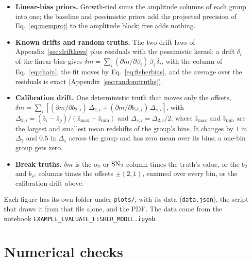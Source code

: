 \documentclass[11pt]{article}
\newcommand{\bstwo}{b_{s^2}}
\newcommand{\SNt}{{\rm SN}_2}
\begin{document}
\begin{itemize}
  \item \textbf{Linear-bias priors.}  Growth-tied sums the amplitude
    columns of each group into one; the baseline and pessimistic priors
    add the projected precision of Eq.~\eqref{eq:memproj} to the
    amplitude block; free adds nothing.
  \item \textbf{Known drifts and random truths.}  The two drift laws of
    Appendix~\ref{sec:driftlaws} plus residuals with the pessimistic
    kernel; a drift $\delta_i$ of the linear bias gives
    $\delta m = \sum_i (\partial m/\partial \beta_i)\,
    \beta_i\,\delta_i$, with the column of Eq.~\eqref{eq:chain}, the
    fit moves by Eq.~\eqref{eq:fisherbias}, and the average over the
    residuals is exact (Appendix~\ref{sec:randomtruths}).
  \item \textbf{Calibration drift.}  One deterministic truth that moves
    only the offsets,
    $\delta m = \sum_i [(\partial m/\partial b_{2,i})\,\Delta_{2,i}
    + (\partial m/\partial b_{s^2,i})\,\Delta_{s,i}]$, with
    $\Delta_{2,i} = (\bar{z}_i - \bar{z}_g)/(\bar{z}_{\max} - \bar{z}_{\min})$
    and $\Delta_{s,i} = \Delta_{2,i}/2$, where $\bar{z}_{\max}$ and
    $\bar{z}_{\min}$ are the largest and smallest mean redshifts of the
    group's bins.  It changes by $1$ in $\Delta_2$ and $0.5$ in
    $\Delta_s$ across the group and has zero mean over its bins; a
    one-bin group gets zero.
  \item \textbf{Break truths.}  $\delta m$ is the $\alpha_2$ or $\SNt$
    column times the truth's value, or the $b_2$ and $\bstwo$ columns
    times the offsets $\pm(2, 1)$, summed over every bin, or the
    calibration drift above.
\end{itemize}

Each figure has its own folder under \texttt{plots/}, with its data
(\texttt{data.json}), the script that draws it from that file alone,
and the PDF.  The data come from the notebook
\texttt{EXAMPLE\_EVALUATE\_FISHER\_MODEL.ipynb}.

\section{Numerical checks}
\label{app:checks}
\end{document}
